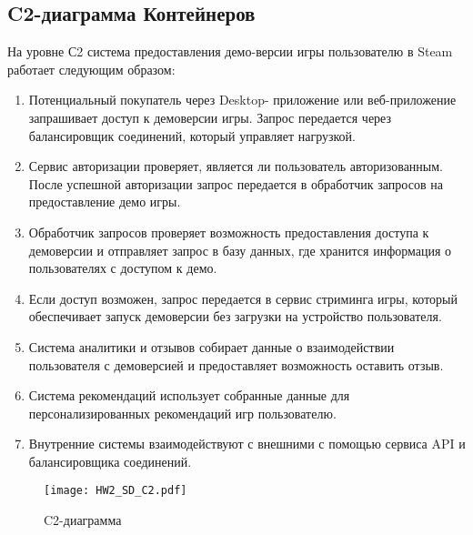 \documentclass[12pt, a4paper]{article}
\begin{document}
\subsection{C2-диаграмма Контейнеров}
На уровне С2 система предоставления демо-версии игры 
пользователю в Steam работает следующим образом:
\begin{enumerate}
	\item Потенциальный покупатель через Desktop-
	приложение или веб-приложение запрашивает доступ 
	к демоверсии игры. Запрос передается через 
	балансировщик соединений, который управляет 
	нагрузкой.
	\item Сервис авторизации проверяет, является ли 
	пользователь авторизованным. После успешной 
	авторизации запрос передается в обработчик 
	запросов на предоставление демо игры.
	\item Обработчик запросов проверяет возможность 
	предоставления доступа к демоверсии и отправляет 
	запрос в базу данных, где хранится информация о 
	пользователях с доступом к демо.
	\item Если доступ возможен, запрос передается в 
	сервис стриминга игры, который обеспечивает 
	запуск демоверсии без загрузки на устройство 
	пользователя.
	\item Система аналитики и отзывов собирает 
	данные о взаимодействии пользователя с 
	демоверсией и предоставляет возможность оставить 
	отзыв.
	\item Система рекомендаций использует собранные 
	данные для персонализированных рекомендаций игр 
	пользователю.
	\item Внутренние системы взаимодействуют с 
	внешними с помощью сервиса API и балансировщика 
	соединений.
\end{enumerate}


\begin{figure}[htbp]
    \centering
    \texttt{[image: HW2\_SD\_C2.pdf]} 
    \caption{C2-диаграмма}
    \label{fig:C2}
\end{figure}

\newpage
\end{document}

